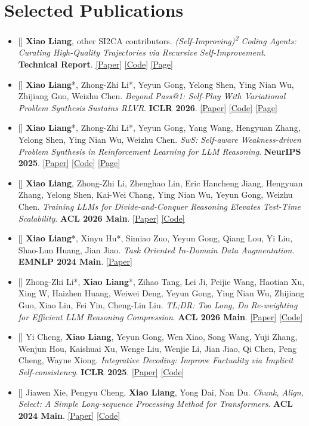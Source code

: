 \documentclass[12pt,a4paper]{article}
\newcommand{\plink}[2]{\href{#1}{[#2]}}
\newcounter{pub}
\newcommand{\publication}[1]{\stepcounter{pub}\item\begin{minipage}[t]{\linewidth}[\thepub] #1\end{minipage}}
\begin{document}
\section*{Selected Publications}
\begin{itemize}[leftmargin=13pt,labelsep=6pt,itemsep=11pt,topsep=0pt]
\publication{\textbf{Xiao Liang}, other SI2CA contributors. \textit{(Self-Improving)\textsuperscript{2} Coding Agents: Curating High-Quality Trajectories via Recursive Self-Improvement}. \textbf{Technical Report}. \plink{https://github.com/Self-Improving-Coding-Agents/SI2CA/blob/main/reports/SI2CA-Technical-Report.pdf}{Paper} \plink{https://github.com/Self-Improving-Coding-Agents/SI2CA}{Code} \plink{https://self-improving-coding-agents.github.io/SI2CA-Visualization/site/\#qwen122b/swebench_pro_731/overview}{Page}}
\publication{\textbf{Xiao Liang}*, Zhong-Zhi Li*, Yeyun Gong, Yelong Shen, Ying Nian Wu, Zhijiang Guo, Weizhu Chen. \textit{Beyond Pass@1: Self-Play With Variational Problem Synthesis Sustains RLVR}. \textbf{ICLR 2026}. \plink{https://arxiv.org/abs/2508.14029}{Paper} \plink{https://github.com/MasterVito/SvS}{Code} \plink{https://mastervito.github.io/SvS/}{Page}}
\publication{\textbf{Xiao Liang}*, Zhong-Zhi Li*, Yeyun Gong, Yang Wang, Hengyuan Zhang, Yelong Shen, Ying Nian Wu, Weizhu Chen. \textit{SwS: Self-aware Weakness-driven Problem Synthesis in Reinforcement Learning for LLM Reasoning}. \textbf{NeurIPS 2025}. \plink{https://arxiv.org/abs/2506.08989}{Paper} \plink{https://github.com/MasterVito/SwS}{Code} \plink{https://mastervito.github.io/SwS/}{Page}}
\publication{\textbf{Xiao Liang}, Zhong-Zhi Li, Zhenghao Lin, Eric Hancheng Jiang, Hengyuan Zhang, Yelong Shen, Kai-Wei Chang, Ying Nian Wu, Yeyun Gong, Weizhu Chen. \textit{Training LLMs for Divide-and-Conquer Reasoning Elevates Test-Time Scalability}. \textbf{ACL 2026 Main}. \plink{https://arxiv.org/abs/2602.02477}{Paper} \plink{https://github.com/MasterVito/DAC-RL}{Code}}
\publication{\textbf{Xiao Liang}*, Xinyu Hu*, Simiao Zuo, Yeyun Gong, Qiang Lou, Yi Liu, Shao-Lun Huang, Jian Jiao. \textit{Task Oriented In-Domain Data Augmentation}. \textbf{EMNLP 2024 Main}. \plink{https://arxiv.org/pdf/2406.16694}{Paper}}
\publication{Zhong-Zhi Li*, \textbf{Xiao Liang}*, Zihao Tang, Lei Ji, Peijie Wang, Haotian Xu, Xing W, Haizhen Huang, Weiwei Deng, Yeyun Gong, Ying Nian Wu, Zhijiang Guo, Xiao Liu, Fei Yin, Cheng-Lin Liu. \textit{TL;DR: Too Long, Do Re-weighting for Efficient LLM Reasoning Compression}. \textbf{ACL 2026 Main}. \plink{https://arxiv.org/abs/2506.02678}{Paper} \plink{https://github.com/zzli2022/TLDR}{Code}}
\publication{Yi Cheng, \textbf{Xiao Liang}, Yeyun Gong, Wen Xiao, Song Wang, Yuji Zhang, Wenjun Hou, Kaishuai Xu, Wenge Liu, Wenjie Li, Jian Jiao, Qi Chen, Peng Cheng, Wayne Xiong. \textit{Integrative Decoding: Improve Factuality via Implicit Self-consistency}. \textbf{ICLR 2025}. \plink{https://arxiv.org/abs/2410.01556}{Paper} \plink{https://github.com/YiCheng98/IntegrativeDecoding}{Code}}
\publication{Jiawen Xie, Pengyu Cheng, \textbf{Xiao Liang}, Yong Dai, Nan Du. \textit{Chunk, Align, Select: A Simple Long-sequence Processing Method for Transformers}. \textbf{ACL 2024 Main}. \plink{https://arxiv.org/pdf/2308.13191}{Paper} \plink{https://github.com/xjw-nlp/SimCAS}{Code}}
\end{itemize}
\end{document}
